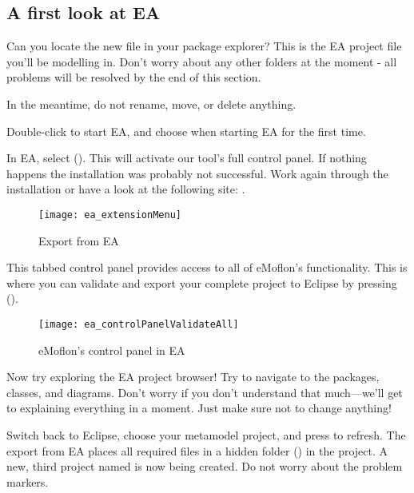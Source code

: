 \clearpage
\genHeader

\subsection{A first look at EA}

\begin{stepbystep}
\FloatBarrier
\hypertarget{simpleDemo vis}{}
\item Can you locate the new  file in your package explorer? This is the EA project file you'll be
modelling in. Don't worry about any other folders at the moment - all problems will be resolved by the end of this section.

In the meantime, do not rename, move, or delete anything.

\item Double-click  to start EA, and choose  when starting EA for the first time.

\item In EA, select  ().
This will activate our tool's full control panel.
If nothing happens the installation was probably not successful. 
Work again through the installation or have a look at the following site:
\newline
{}.
%
\begin{figure}[htbp]
	\centering
  \texttt{[image: ea\_extensionMenu]}
	\caption{Export from EA} 
	\label{ea:validate_dropdown} 
\end{figure}
%
\item
This tabbed control panel provides access to all of eMoflon's functionality.
This is where you can validate and export your complete project to Eclipse by pressing  ().
%
\begin{figure}[htbp]
	\centering
  \texttt{[image: ea\_controlPanelValidateAll]}
	\caption{eMoflon's control panel in EA} 
	\label{ea:controlPanel} 
\end{figure}
%
\item
Now try exploring the EA project browser!
Try to navigate to the packages, classes, and diagrams.
Don't worry if you don't understand that much---we'll get to explaining everything in a moment.
Just make sure not to change anything!

\item Switch back to Eclipse, choose your metamodel project, and press  to refresh. 
The export from EA places all required files in a hidden folder () in the project.
A new, third project named  is now being created.
Do not worry about the problem markers.


\end{stepbystep}
